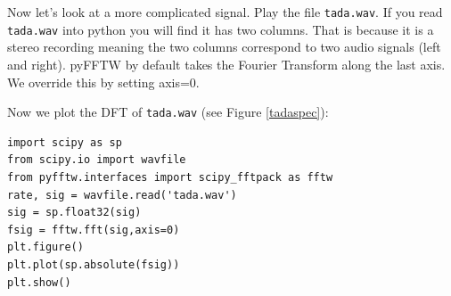 Now let's look at a more complicated signal. Play the file \texttt{tada.wav}.  
If you read \texttt{tada.wav} into python you will find it has two columns.  
That is because it is a stereo recording meaning the two columns correspond to two audio signals (left and right).  
pyFFTW by default takes the Fourier Transform along the last axis.  We override this by setting axis=0. 

Now we plot the DFT of \texttt{tada.wav} (see Figure \ref{tadaspec}):
\begin{lstlisting}
import scipy as sp
from scipy.io import wavfile
from pyfftw.interfaces import scipy_fftpack as fftw
rate, sig = wavfile.read('tada.wav')
sig = sp.float32(sig)
fsig = fftw.fft(sig,axis=0)
plt.figure()
plt.plot(sp.absolute(fsig))
plt.show()
\end{lstlisting}


